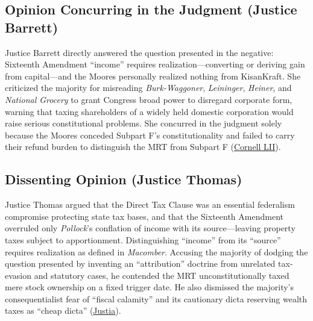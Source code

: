 \documentclass[12pt]{article}
\begin{document}
\subsection{Opinion Concurring in the Judgment (Justice Barrett)}

Justice Barrett directly answered the question presented in the negative: Sixteenth Amendment ``income'' requires realization---converting or deriving gain from capital---and the Moores personally realized nothing from KisanKraft. She criticized the majority for misreading \textit{Burk-Waggoner}, \textit{Leininger}, \textit{Heiner}, and \textit{National Grocery} to grant Congress broad power to disregard corporate form, warning that taxing shareholders of a widely held domestic corporation would raise serious constitutional problems. She concurred in the judgment solely because the Moores conceded Subpart F's constitutionality and failed to carry their refund burden to distinguish the MRT from Subpart F (\href{https://www.law.cornell.edu/supremecourt/text/22-800_2024-06-20}{Cornell LII}).

\subsection{Dissenting Opinion (Justice Thomas)}

Justice Thomas argued that the Direct Tax Clause was an essential federalism compromise protecting state tax bases, and that the Sixteenth Amendment overruled only \textit{Pollock}'s conflation of income with its source---leaving property taxes subject to apportionment. Distinguishing ``income'' from its ``source'' requires realization as defined in \textit{Macomber}. Accusing the majority of dodging the question presented by inventing an ``attribution'' doctrine from unrelated tax-evasion and statutory cases, he contended the MRT unconstitutionally taxed mere stock ownership on a fixed trigger date. He also dismissed the majority's consequentialist fear of ``fiscal calamity'' and its cautionary dicta reserving wealth taxes as ``cheap dicta'' (\href{https://supreme.justia.com/cases/federal/us/602/22-800/}{Justia}).
\end{document}
